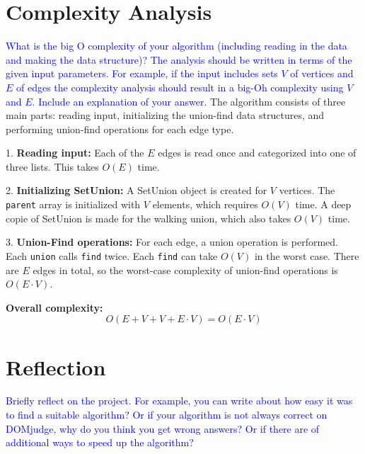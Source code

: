 \documentclass[a4paper]{article}
\newcommand{\instruction}[1]{\textcolor{blue}{#1}}
\begin{document}
\section{Complexity Analysis}
\instruction{What is the big O complexity of your algorithm (including reading in the data and making the data structure)? The analysis should be written in terms of the given input parameters. For example, if the input includes sets $V$ of vertices and $E$ of edges the complexity analysis should result in a big-Oh complexity using $V$ and $E$. Include an explanation of your answer.} 
The algorithm consists of three main parts: reading input, initializing the union-find data structures, and performing union-find operations for each edge type. 

1. \textbf{Reading input:} Each of the $E$ edges is read once and categorized into one of three lists. This takes $O(E)$ time. 

2. \textbf{Initializing SetUnion:} A SetUnion object is created for $V$ vertices. The \texttt{parent} array is initialized with $V$ elements, which requires $O(V)$ time. A deep copie of SetUnion is made for the walking union, which also takes $O(V)$ time.

3. \textbf{Union-Find operations:} For each edge, a union operation is performed. Each \texttt{union} calls \texttt{find} twice. Each \texttt{find} can take $O(V)$ in the worst case. There are $E$ edges in total, so the worst-case complexity of union-find operations is $O(E \cdot V)$.  

\textbf{Overall complexity:}  
\[
O(E + V + V + E \cdot V) = O(E \cdot V)
\]
\section{Reflection}
\instruction{Briefly reflect on the project. For example, you can write about how easy it was to find a suitable algorithm? Or if your algorithm is not always correct on DOMjudge, why do you think you get wrong answers? Or if there are of additional ways to speed up the algorithm?}
\end{document}
